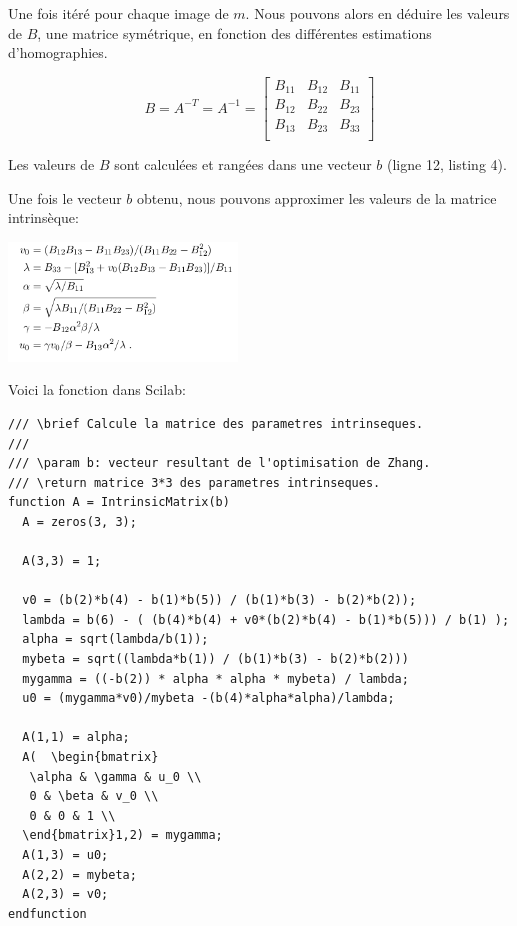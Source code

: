 \documentclass[a4paper,11pt]{article}
\begin{document}
Une fois itéré pour chaque image de $m$. Nous pouvons alors en déduire les 
valeurs de $B$, une matrice symétrique, en fonction des différentes estimations 
d'homographies.

\begin{equation}
  B = A^{-T} = A^{-1} =
  \begin{bmatrix}
    B_{11} & B_{12} & B_{11} \\
    B_{12} & B_{22} & B_{23} \\
    B_{13} & B_{23} & B_{33} \\
  \end{bmatrix}
\end{equation}

Les valeurs de $B$ sont calculées et rangées dans une vecteur $b$ (ligne 12, listing 4).

Une fois le vecteur $b$ obtenu, nous pouvons approximer les valeurs de la matrice intrinsèque:

\begin{center}
  \includegraphics[width=230px]{annexe_b.png}
\end{center}

Voici la fonction dans Scilab:

\begin{lstlisting}[caption=Fonction d'approximation de la matrice intrinsèque à partir de b]
/// \brief Calcule la matrice des parametres intrinseques.
///
/// \param b: vecteur resultant de l'optimisation de Zhang.
/// \return matrice 3*3 des parametres intrinseques.
function A = IntrinsicMatrix(b)
  A = zeros(3, 3);
  
  A(3,3) = 1;
  
  v0 = (b(2)*b(4) - b(1)*b(5)) / (b(1)*b(3) - b(2)*b(2));
  lambda = b(6) - ( (b(4)*b(4) + v0*(b(2)*b(4) - b(1)*b(5))) / b(1) );
  alpha = sqrt(lambda/b(1));
  mybeta = sqrt((lambda*b(1)) / (b(1)*b(3) - b(2)*b(2)))
  mygamma = ((-b(2)) * alpha * alpha * mybeta) / lambda;
  u0 = (mygamma*v0)/mybeta -(b(4)*alpha*alpha)/lambda;
  
  A(1,1) = alpha;
  A(  \begin{bmatrix}
   \alpha & \gamma & u_0 \\
   0 & \beta & v_0 \\
   0 & 0 & 1 \\
  \end{bmatrix}1,2) = mygamma;
  A(1,3) = u0;
  A(2,2) = mybeta;
  A(2,3) = v0;
endfunction
\end{lstlisting}
\end{document}
